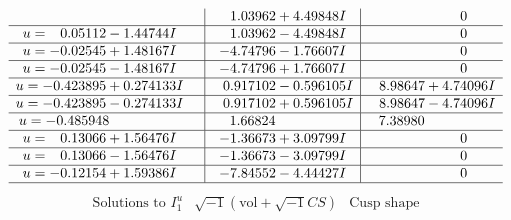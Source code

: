\documentclass[1p]{elsarticle_modified}
\theoremstyle{definition}
\newcommand{\I}{\sqrt{-1}}
\begin{document}
$$\begin{array}{c|c|c}
 & \phantom{-}1.03962 + 4.49848 I & \phantom{-0.000000 } 0 \\ \hline\begin{aligned}
u &= \phantom{-}0.05112 - 1.44744 I\end{aligned}
 & \phantom{-}1.03962 - 4.49848 I & \phantom{-0.000000 } 0 \\ \hline\begin{aligned}
u &= -0.02545 + 1.48167 I\end{aligned}
 & -4.74796 - 1.76607 I & \phantom{-0.000000 } 0 \\ \hline\begin{aligned}
u &= -0.02545 - 1.48167 I\end{aligned}
 & -4.74796 + 1.76607 I & \phantom{-0.000000 } 0 \\ \hline\begin{aligned}
u &= -0.423895 + 0.274133 I\end{aligned}
 & \phantom{-}0.917102 - 0.596105 I & \phantom{-}8.98647 + 4.74096 I \\ \hline\begin{aligned}
u &= -0.423895 - 0.274133 I\end{aligned}
 & \phantom{-}0.917102 + 0.596105 I & \phantom{-}8.98647 - 4.74096 I \\ \hline\begin{aligned}
u &= -0.485948\phantom{ +0.000000I}\end{aligned}
 & \phantom{-}1.66824\phantom{ +0.000000I} & \phantom{-}7.38980\phantom{ +0.000000I} \\ \hline\begin{aligned}
u &= \phantom{-}0.13066 + 1.56476 I\end{aligned}
 & -1.36673 + 3.09799 I & \phantom{-0.000000 } 0 \\ \hline\begin{aligned}
u &= \phantom{-}0.13066 - 1.56476 I\end{aligned}
 & -1.36673 - 3.09799 I & \phantom{-0.000000 } 0 \\ \hline\begin{aligned}
u &= -0.12154 + 1.59386 I\end{aligned}
 & -7.84552 - 4.44427 I & \phantom{-0.000000 } 0\\
 \hline 
 \end{array}$$\newpage$$\begin{array}{c|c|c}  
\text{Solutions to }I^u_{1}& \I (\text{vol} + \sqrt{-1}CS) & \text{Cusp shape}\\
 \hline 
\begin{aligned}

\end{aligned}
\end{array}$$
\end{document}
